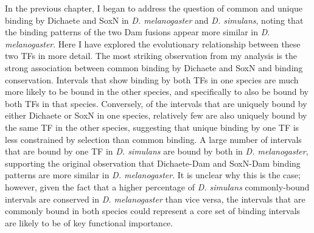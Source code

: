 In the previous chapter, I began to address the question of common and unique binding by Dichaete and SoxN in \emph{D. melanogaster} and \emph{D. simulans}, noting that the binding patterns of the two Dam fusions appear more similar in \emph{D. melanogaster}. Here I have explored the evolutionary relationship between these two TFs in more detail. The most striking observation from my analysis is the strong association between common binding by Dichaete and SoxN and binding conservation. Intervals that show binding by both TFs in one species are much more likely to be bound in the other species, and specifically to also be bound by both TFs in that species. Conversely, of the intervals that are uniquely bound by either Dichaete or SoxN in one species, relatively few are also uniquely bound by the same TF in the other species, suggesting that unique binding by one TF is less constrained by selection than common binding. A large number of intervals that are bound by one TF in \emph{D. simulans} are bound by both in \emph{D. melanogaster}, supporting the original observation that Dichaete-Dam and SoxN-Dam binding patterns are more similar in \emph{D. melanogaster}. It is unclear why this is the case; however, given the fact that a higher percentage of \emph{D. simulans} commonly-bound intervals are conserved in \emph{D. melanogaster} than vice versa, the intervals that are commonly bound in both species could represent a core set of binding intervals are likely to be of key functional importance.\\

